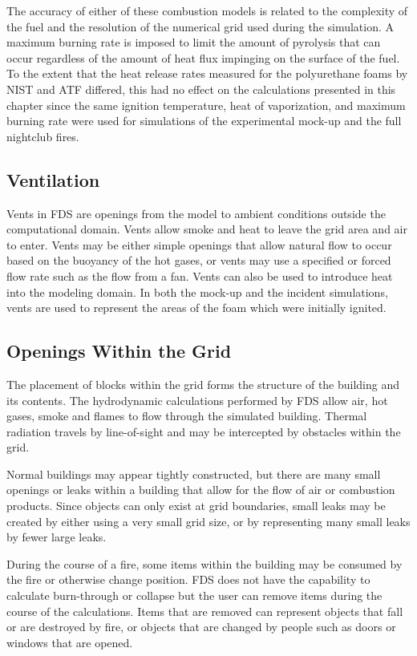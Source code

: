 \documentclass[11pt]{book}
\begin{document}
The accuracy of either of these combustion models is related to the complexity of the fuel and the resolution of the numerical grid used during the simulation. A maximum burning rate is imposed to limit the amount of pyrolysis that can occur regardless of the amount of heat flux impinging on the surface of the fuel. To the extent that the heat release rates measured for the polyurethane foams by NIST and ATF differed, this had no effect on the calculations presented in this chapter since the same ignition temperature, heat of vaporization, and maximum burning rate were used for simulations of the experimental mock-up and the full nightclub fires.

\subsection{Ventilation}
Vents in FDS are openings from the model to ambient conditions outside the computational domain. Vents allow smoke and heat to leave the grid area and air to enter. Vents may be either simple openings that allow natural flow to occur based on the buoyancy of the hot gases, or vents may use a specified or forced flow rate such as the flow from a fan. Vents can also be used to introduce heat into the modeling domain. In both the mock-up and the incident simulations, vents are used to represent the areas of the foam which were initially ignited.

\subsection{Openings Within the Grid}
The placement of blocks within the grid forms the structure of the building and its contents. The hydrodynamic calculations performed by FDS allow air, hot gases, smoke and flames to flow through the simulated building. Thermal radiation travels by line-of-sight and may be intercepted by obstacles within the grid.

Normal buildings may appear tightly constructed, but there are many small openings or leaks within a building that allow for the flow of air or combustion products. Since objects can only exist at grid boundaries, small leaks may be created by either using a very small grid size, or by representing many small leaks by fewer large leaks.

During the course of a fire, some items within the building may be consumed by the fire or otherwise change position. FDS does not have the capability to calculate burn-through or collapse but the user can remove items during the course of the calculations. Items that are removed can represent objects that fall or are destroyed by fire, or objects that are changed by people such as doors or windows that are opened.
\end{document}
